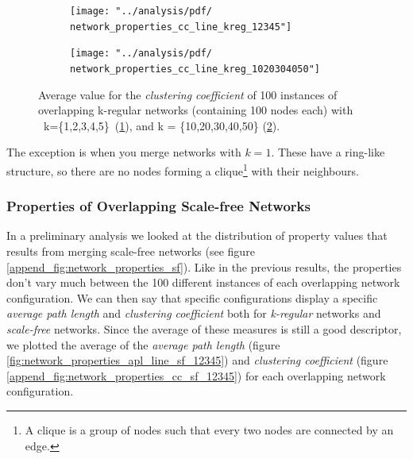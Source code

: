 \documentclass[preprint,number]{elsarticle}
\begin{document}
\begin{figure}[H]
	\centering
	\begin{subfigure}{.5\linewidth}
		\centering
		\texttt{[image: "../analysis/pdf/ network\_properties\_cc\_line\_kreg\_12345"]}
		\caption{}
		\label{fig:network_properties_cc_line_kreg_12345}
	\end{subfigure}%
	\begin{subfigure}{.5\linewidth}
		\centering
		\texttt{[image: "../analysis/pdf/ network\_properties\_cc\_line\_kreg\_1020304050"]}
		\caption{}
		\label{fig:network_properties_cc_line_kreg_1020304050}
	\end{subfigure}
	\begin{minipage}{0.9\textwidth}
		\vspace{0.2cm}
		\caption{Average value for the \textit{clustering coefficient} of 100 instances of overlapping k-regular networks (containing 100 nodes each) with ~k=\{1,2,3,4,5\}~(\ref{fig:network_properties_cc_line_kreg_12345}), and  k = \{10,20,30,40,50\} (\ref{fig:network_properties_cc_line_kreg_1020304050}).}
		\label{fig:network_properties_cc_line_kreg}
	\end{minipage}
\end{figure}

The exception is when you merge networks with $k=1$. These have a ring-like structure, so there are no nodes forming a clique\footnote{A clique is a group of nodes such that every two nodes are connected by an edge.} with their neighbours. 

\subsubsection{Properties of Overlapping Scale-free Networks}
In a preliminary analysis we looked at the distribution of property values that results from merging scale-free networks (see figure \ref{append_fig:network_properties_sf}). Like in the previous results, the properties don't vary much between the 100 different instances of each overlapping network configuration. We can then say that specific configurations display a specific \textit{average path length} and \textit{clustering coefficient} both for \textit{k-regular} networks and \textit{scale-free} networks. Since the average of these measures is still a good descriptor, we plotted the average of the \textit{average path length} (figure \ref{fig:network_properties_apl_line_sf_12345}) and \textit{clustering coefficient} (figure \ref{append_fig:network_properties_cc_sf_12345}) for each overlapping network configuration.
\end{document}
